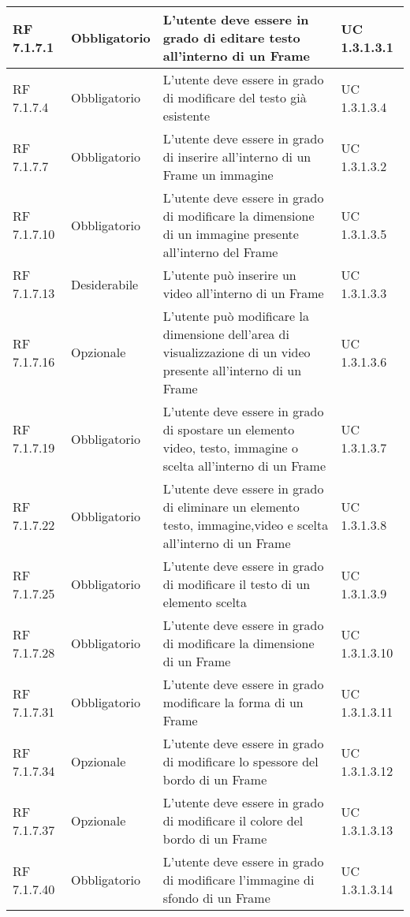 {\begin{longtable} [c]{| p{2.5cm} | p{2.5cm} | p{6cm} |p{2.5cm}|}
			RF 7.1.7.1 & Obbligatorio & L'utente deve essere in grado di editare testo all'interno di un Frame\ped{g} & UC 1.3.1.3.1\\
			\hline
			RF 7.1.7.4 & Obbligatorio & L'utente deve essere in grado di modificare del testo già esistente & UC 1.3.1.3.4\\
			\hline
			RF 7.1.7.7 & Obbligatorio & L'utente deve essere in grado di inserire all'interno di un Frame\ped{g} un immagine & UC 1.3.1.3.2\\
			\hline
			RF 7.1.7.10 & Obbligatorio & L'utente deve essere in grado di modificare la dimensione di un immagine presente all'interno del Frame\ped{g} & UC 1.3.1.3.5\\
			\hline
			RF 7.1.7.13 & Desiderabile & L'utente può inserire un video all'interno di un Frame\ped{g} & UC 1.3.1.3.3\\
			\hline
			RF 7.1.7.16 & Opzionale & L'utente può modificare la dimensione dell’area di visualizzazione di un video presente all'interno di un Frame\ped{g}  & UC 1.3.1.3.6\\
			\hline
			RF 7.1.7.19 & Obbligatorio & L'utente deve essere in grado di spostare un elemento video, testo, immagine o scelta all'interno di un Frame\ped{g} & UC 1.3.1.3.7\\
			\hline
			RF 7.1.7.22 & Obbligatorio & L'utente deve essere in grado di eliminare un elemento testo, immagine,video e scelta all'interno di un Frame\ped{g} & UC 1.3.1.3.8\\
			\hline
			RF 7.1.7.25 & Obbligatorio & L'utente deve essere in grado di modificare il testo di un elemento scelta\ped{g} & UC 1.3.1.3.9\\
			\hline
			RF 7.1.7.28 & Obbligatorio & L'utente deve essere in grado di modificare la dimensione di un Frame\ped{g} & UC 1.3.1.3.10\\
			\hline
			RF 7.1.7.31 & Obbligatorio & L'utente deve essere in grado modificare la forma di un Frame\ped{g} & UC 1.3.1.3.11\\
			\hline
			RF 7.1.7.34 & Opzionale & L'utente deve essere in grado di modificare lo spessore del bordo di un Frame\ped{g} & UC 1.3.1.3.12\\
			\hline
			RF 7.1.7.37 & Opzionale & L'utente deve essere in grado di modificare il colore del bordo di un Frame\ped{g} & UC 1.3.1.3.13\\
			\hline
			RF 7.1.7.40 & Obbligatorio & L'utente deve essere in grado di modificare l'immagine di sfondo di un Frame\ped{g} & UC 1.3.1.3.14\\

\end{longtable}}
